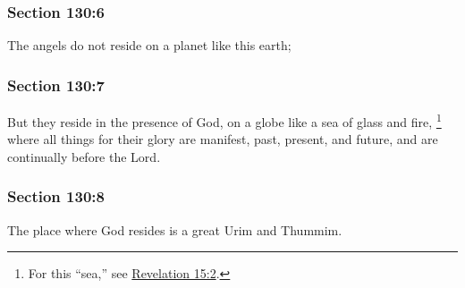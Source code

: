 	\subsubsection{Section 130:6} %
		\label{DC130-6}

		The angels do not reside on a planet like this earth;


	\subsubsection{Section 130:7} %
		\label{DC130-7}

		But they reside in the presence of God, on a globe like a sea of glass and fire,%
			\footnote{%
				For this ``sea,'' see \hyperref[REVELATIONNT-15-2]{Revelation 15:2}.
				}
		where all things for their glory are manifest, past, present, and future, and are continually before the Lord.


	\subsubsection{Section 130:8} %
		\label{DC130-8}

		The place where God resides is a great Urim and Thummim.


